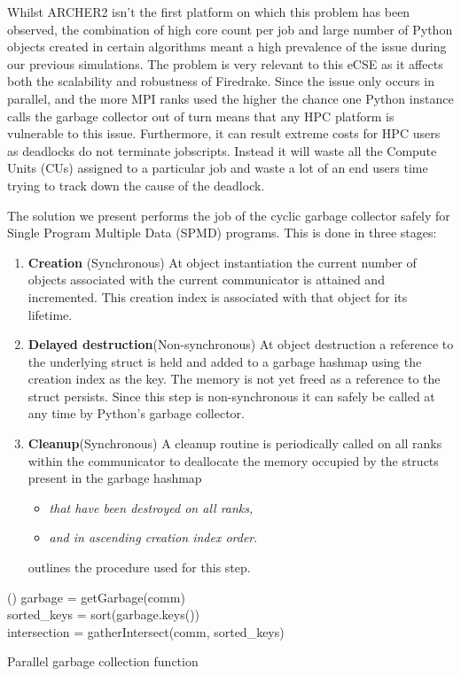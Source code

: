 \documentclass[a4paper,11pt]{article}
\begin{document}
Whilst ARCHER2 isn't the first platform on which this problem has been observed, the combination of high core count per job and large number of Python objects created in certain algorithms meant a high prevalence of the issue during our previous simulations.
The problem is very relevant to this eCSE as it affects both the scalability and robustness of Firedrake.
Since the issue only occurs in parallel, and the more MPI ranks used the higher the chance one Python instance calls the garbage collector out of turn means that any HPC platform is vulnerable to this issue.
Furthermore, it can result extreme costs for HPC users as deadlocks do not terminate jobscripts.
Instead it will waste all the Compute Units (CUs) assigned to a particular job and waste a lot of an end users time trying to track down the cause of the deadlock.

The solution we present performs the job of the cyclic garbage collector safely for Single Program Multiple Data (SPMD) programs.
This is done in three stages:
\begin{enumerate}
	\item \label{item:create}\textbf{Creation} (Synchronous)
	At object instantiation the current number of objects associated with the current communicator is attained and incremented.
	This creation index is associated with that object for its lifetime.
	\item \label{item:destroy}\textbf{Delayed destruction}(Non-synchronous)
	At object destruction a reference to the underlying struct is held and added to a garbage hashmap using the creation index as the key.
	The memory is not yet freed as a reference to the struct persists.
	Since this step is non-synchronous it can safely be called at any time by Python's garbage collector.
	\item \label{item:cleanup}\textbf{Cleanup}(Synchronous)
	A cleanup routine is periodically called on all ranks within the communicator to deallocate the memory occupied by the structs present in the garbage hashmap 
	\begin{itemize}[topsep=0pt, partopsep=0pt, itemsep=1pt, parsep=1pt]
	\item \emph{that have been destroyed on all ranks,}
	\item \emph{and in ascending creation index order}.
    \end{itemize}
     outlines the procedure used for this step.
\end{enumerate}

\begin{algorithm}[htp]
	\Function(){
		garbage = getGarbage(comm)\\
		sorted\_keys = sort(garbage.keys())\\
		intersection = gatherIntersect(comm, sorted\_keys)\\
	}
	\caption[]{Parallel garbage collection function}
	\label{alg:cleanup}
\end{algorithm}
\end{document}
